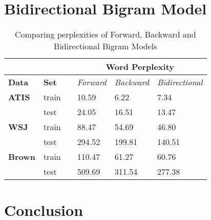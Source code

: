 \documentclass{article}
\begin{document}
\section{Bidirectional Bigram Model}
\begin{table}[h]
\centering
\begin{tabular}{@{}llllll@{}}
\toprule
\textbf{}      & \textbf{}    &  & \multicolumn{3}{c}{\textbf{Word Perplexity}}                  \\ \midrule
\textbf{Data}  & \textbf{Set} &  & \textit{Forward} & \textit{Backward} & \textit{Bidirectional} \\ \midrule
\textbf{ATIS}  & train        &  & 10.59           & 6.22             & 7.34                  \\ \midrule
               & test         &  & 24.05           & 16.51            & 13.47                 \\ \midrule
\textbf{WSJ}   & train        &  & 88.47           & 54.69            & 46.80                 \\ \midrule
               & test         &  & 294.52           & 199.81           & 140.51                \\ \midrule
\textbf{Brown} & train        &  & 110.47          & 61.27            & 60.76                  \\ \midrule
               & test         &  & 509.69          & 311.54           & 277.38               \\ \bottomrule
\end{tabular}
\caption{Comparing perplexities of Forward, Backward and Bidirectional Bigram Models}
\label{all}
\end{table}
\section{Conclusion}
\end{document}
